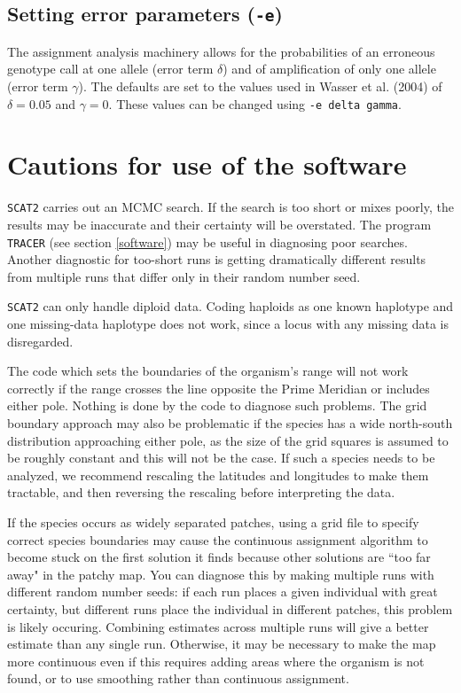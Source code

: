 \documentclass[10pt,titlepage,times,letterpaper]{article}
\def\SCAT{{\tt SCAT2} }
\begin{document}
\subsection{Setting error parameters ({\tt -e})}

The assignment analysis machinery allows for the probabilities
of an erroneous genotype call at one allele
(error term $\delta$) and of amplification of only one allele (error term
$\gamma$).  The defaults are set to the values used in Wasser et al. (2004)
of $\delta = 0.05$ and $\gamma = 0$.  These values can be changed
using {\tt -e delta gamma}.




\section{Cautions for use of the software} \label{cautions}

\SCAT carries out an MCMC search.  If the search is too short or mixes
poorly, the results may be inaccurate and their certainty will be overstated.  The program
{\tt TRACER} (see section \ref{software}) may be useful in diagnosing poor
searches.  Another diagnostic for too-short runs is getting dramatically different
results from multiple runs that differ only in their random number seed.

\SCAT can only handle diploid data.  Coding haploids as one known haplotype and
one missing-data haplotype does not work, since a locus with any missing
data is disregarded.

The code which sets the boundaries of the organism's range
will not work correctly if the range crosses the line opposite
the Prime Meridian or includes either pole.  Nothing is done by the code to
diagnose such problems.  
The grid boundary approach may also be problematic if the species has a wide
north-south distribution approaching either pole, as the size of the grid 
squares is assumed to be roughly constant and this will not be the case.
If such a species needs to be analyzed, we recommend rescaling the latitudes and
longitudes to make them tractable, and then reversing the rescaling before
interpreting the data.  

If the species occurs as widely separated patches, using a grid file
to specify correct species boundaries may cause the continuous assignment algorithm
to become stuck on the first solution it finds because other solutions are 
``too far away" in the patchy map.  You can diagnose this by making
multiple runs with different random number seeds:  if each run places a
given individual with great certainty, but different runs place the
individual in different patches, this problem is likely occuring.  Combining
estimates across multiple runs will give a better estimate than any
single run.  Otherwise, it may be necessary to make the map more continuous
even if this requires adding areas where the organism is not found, or to
use smoothing rather than continuous assignment.
\end{document}
